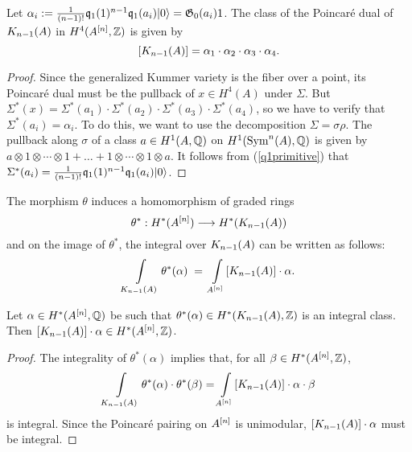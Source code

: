 \begin{proposition}
Let $\alpha_i := \frac{1}{(n-1)!}\kq_{1}(1)^{n-1}\kq_1(a_i)\vac = \G_0(a_i)1$. The class of the Poincar\'e dual of $\kum{A}{n-1}$ in $H^4(A\hilb{n},\Z)$ is given by
$$
[\kum{A}{n-1}]=\alpha_1\cdot\alpha_2\cdot\alpha_3\cdot\alpha_4.
$$ 
\end{proposition}
\begin{proof}
Since the generalized Kummer variety is the fiber over a point, its Poincar\'e dual must be the pullback of $x\in H^4(A)$ under $\Sigma$. But $\Sigma^* (x) = \Sigma^*(a_1)\cdot \Sigma^*(a_2)\cdot \Sigma^*(a_3)\cdot \Sigma^*(a_4)$, so we have to verify that $\Sigma^* (a_i) = \alpha_i$. To do this, we want to use the decomposition $\Sigma = \sigma\rho$.
The pullback along $\sigma$ of a class $a\in H^1(A,\Q)$ on $H^1(\Sym^n(A),\Q)$ 
is given by $a\otimes 1\otimes \cdots\otimes 1 + \ldots + 1\otimes \cdots\otimes 1\otimes a$. It follows from (\ref{q1primitive}) that $\Sigma^* (a_i) = \frac{1}{(n-1)!}\kq_{1}(1)^{n-1}\kq_1(a_i)\vac $.
\end{proof}
The morphism $\theta$ induces a homomorphism of graded rings
\begin{equation}
\theta^* :H^*(A\hilb{n})\longrightarrow H^*(\kum{A}{n-1})
\end{equation}
and on the image of $\theta^*$, the integral over $\kum{A}{n-1}$ can be written as follows:
\begin{equation}
\int\limits_{\kum{A}{n-1}}\theta^*(\alpha)\; =\; \int\limits_{A\hilb{n}} [\kum{A}{n-1}]\cdot\alpha .
\end{equation}
\begin{lemma}\label{IntegralityCheck}
Let $\alpha\in H^*(A\hilb{n},\Q)$ be such that $\theta^*(\alpha)\in  H^*(\kum{A}{n-1},\Z)$ is an integral class. Then $[\kum{A}{n-1}]\cdot\alpha \in H^*(A\hilb{n},\Z)$. 
\end{lemma}
\begin{proof}
The integrality of $\theta^*(\alpha)$ implies that, for all $\beta \in H^*(A\hilb{n},\Z)$,
$$
\int\limits_{\kum{A}{n-1}} \theta^*(\alpha)\cdot\theta^*(\beta) = \int\limits_{A\hilb{n}} [\kum{A}{n-1}]\cdot\alpha\cdot\beta
$$
is integral. Since the Poincar\'e pairing on $A\hilb{n}$ is unimodular, $[\kum{A}{n-1}]\cdot\alpha$ must be integral.
\end{proof}

